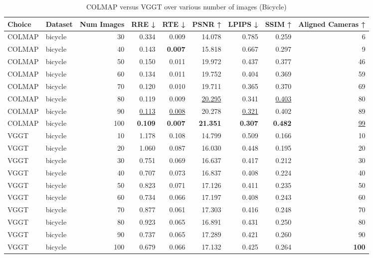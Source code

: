 \begin{table}[H]
\caption{\ifdefined\customcaption \customcaption \else COLMAP versus VGGT over various number of images (Bicycle) \fi}
\label{tab:01_num_images_bicycle}
\centering
\scriptsize
\begin{tabular}{llrrrrrrr}
\toprule
Choice & Dataset & Num Images & RRE ↓ & RTE ↓ & PSNR ↑ & LPIPS ↓ & SSIM ↑ & Aligned Cameras ↑ \\
\midrule
COLMAP & bicycle & 30 & 0.334 & 0.009 & 14.078 & 0.785 & 0.259 & 6 \\
COLMAP & bicycle & 40 & 0.143 & \textbf{0.007} & 15.818 & 0.667 & 0.297 & 9 \\
COLMAP & bicycle & 50 & 0.150 & 0.011 & 19.972 & 0.437 & 0.377 & 46 \\
COLMAP & bicycle & 60 & 0.134 & 0.011 & 19.752 & 0.404 & 0.369 & 59 \\
COLMAP & bicycle & 70 & 0.120 & 0.010 & 19.711 & 0.365 & 0.370 & 69 \\
COLMAP & bicycle & 80 & 0.119 & 0.009 & \underline{20.295} & 0.341 & \underline{0.403} & 80 \\
COLMAP & bicycle & 90 & \underline{0.113} & \underline{0.008} & 20.278 & \underline{0.321} & 0.402 & 89 \\
COLMAP & bicycle & 100 & \textbf{0.109} & \textbf{0.007} & \textbf{21.351} & \textbf{0.307} & \textbf{0.482} & \underline{99} \\
VGGT & bicycle & 10 & 1.178 & 0.108 & 14.799 & 0.509 & 0.166 & 10 \\
VGGT & bicycle & 20 & 1.060 & 0.087 & 16.030 & 0.448 & 0.195 & 20 \\
VGGT & bicycle & 30 & 0.751 & 0.069 & 16.637 & 0.417 & 0.212 & 30 \\
VGGT & bicycle & 40 & 0.707 & 0.073 & 16.837 & 0.408 & 0.224 & 40 \\
VGGT & bicycle & 50 & 0.823 & 0.071 & 17.126 & 0.411 & 0.235 & 50 \\
VGGT & bicycle & 60 & 0.734 & 0.066 & 17.197 & 0.408 & 0.243 & 60 \\
VGGT & bicycle & 70 & 0.877 & 0.061 & 17.303 & 0.416 & 0.248 & 70 \\
VGGT & bicycle & 80 & 0.923 & 0.065 & 16.891 & 0.431 & 0.250 & 80 \\
VGGT & bicycle & 90 & 0.737 & 0.065 & 17.289 & 0.421 & 0.260 & 90 \\
VGGT & bicycle & 100 & 0.679 & 0.066 & 17.132 & 0.425 & 0.264 & \textbf{100} \\
\bottomrule
\end{tabular}
\end{table}
